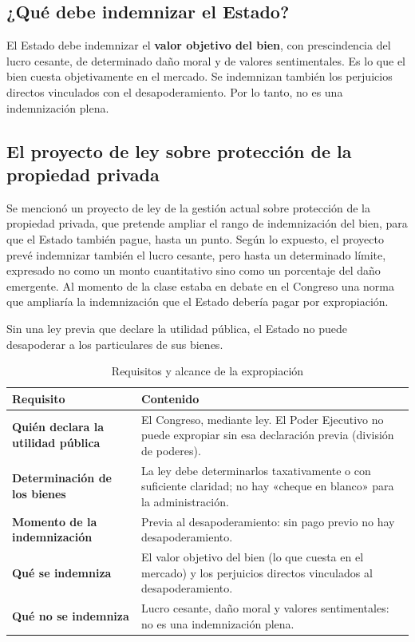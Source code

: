 \documentclass[12pt,oneside]{book}
\begin{document}
\subsection{¿Qué debe indemnizar el Estado?}

El Estado debe indemnizar el \textbf{valor objetivo del bien}, con prescindencia del lucro cesante, de determinado daño moral y de valores sentimentales. Es lo que el bien cuesta objetivamente en el mercado. Se indemnizan también los perjuicios directos vinculados con el desapoderamiento. Por lo tanto, no es una indemnización plena.

\subsection{El proyecto de ley sobre protección de la propiedad privada}

Se mencionó un proyecto de ley de la gestión actual sobre protección de la propiedad privada, que pretende ampliar el rango de indemnización del bien, para que el Estado también pague, hasta un punto. Según lo expuesto, el proyecto prevé indemnizar también el lucro cesante, pero hasta un determinado límite, expresado no como un monto cuantitativo sino como un porcentaje del daño emergente. Al momento de la clase estaba en debate en el Congreso una norma que ampliaría la indemnización que el Estado debería pagar por expropiación.


Sin una ley previa que declare la utilidad pública, el Estado no puede desapoderar a los particulares de sus bienes.

\begin{table}[H]
\centering
\small
\caption{Requisitos y alcance de la expropiación}
\begin{tabularx}{\textwidth}{>{\raggedright\arraybackslash\bfseries}p{3.4cm} >{\raggedright\arraybackslash}X}
\toprule
Requisito & Contenido \\
\midrule
Quién declara la utilidad pública & El Congreso, mediante ley. El Poder Ejecutivo no puede expropiar sin esa declaración previa (división de poderes). \\
Determinación de los bienes & La ley debe determinarlos taxativamente o con suficiente claridad; no hay «cheque en blanco» para la administración. \\
Momento de la indemnización & Previa al desapoderamiento: sin pago previo no hay desapoderamiento. \\
Qué se indemniza & El valor objetivo del bien (lo que cuesta en el mercado) y los perjuicios directos vinculados al desapoderamiento. \\
Qué no se indemniza & Lucro cesante, daño moral y valores sentimentales: no es una indemnización plena. \\
\bottomrule
\end{tabularx}
\end{table}
\end{document}
